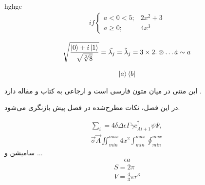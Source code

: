 hghgc
\begin{equation}
\begin{aligned}
if
	\begin{cases}
		 a<0<5;  &2x^2+3
		\\
		a \ge 0;  &4x^3
	\end{cases}
\end{aligned}
\end{equation}


\begin{equation}
	\begin{aligned}
		\sqrt{\frac{\ket{0} + i \ket{1}}{\sqrt{\sqrt[3]{8}}}} = \tilde{\lambda_j} = \tilde{\lambda}_j = 3\times2 . \otimes \dots \dot{a} \sim a
	\end{aligned}
\end{equation}

\begin{equation}
	\begin{aligned}
		\ket{a}\bra{b}
	\end{aligned}
\end{equation}
\begin{center}

\end{center}


%
%
این متنی  در میان متون فارسی است و ارجاعی به کتاب و مقاله دارد \cite{16}.

در این فصل، نکات مطرح‌شده در فصل پیش بازنگری می‌شود.





\begin{equation}\label{ffgc}
	\begin{aligned}
		\sum_{i} = 4 \delta \Delta \epsilon \Gamma \gamma c^{\dagger}_{Ai+1}
		\psi \Psi, \\ \vec{\sigma} \vec{A}
		\iint_{min}^{max} 4x^2
		\int_{min}^{max}
		\oint_{min}^{max}
	\end{aligned}
\end{equation}
سامیشن و ...
\begin{equation}\label{sjdhcbds}
	\begin{aligned}
		\epsilon a
	\end{aligned}
\end{equation}
\begin{equation}\label{ffgc}
	\begin{aligned}
		S =  2\pi\\
		V = \frac{4}{3} \pi r^3
	\end{aligned}
\end{equation}

